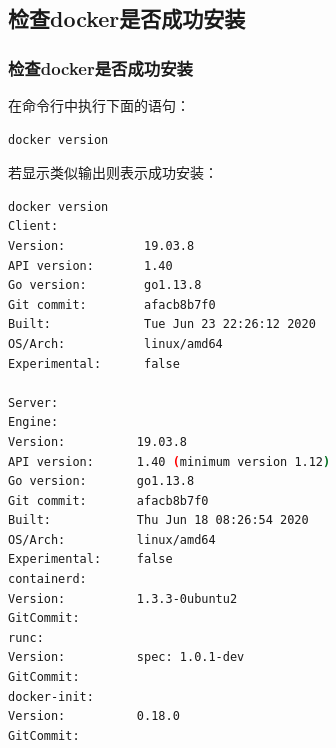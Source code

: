 \documentclass[11pt]{beamer}
\begin{document}
\subsection{检查docker是否成功安装}
\begin{frame}[fragile]
	\frametitle{检查docker是否成功安装}
	在命令行中执行下面的语句：
	\begin{lstlisting}[language=sh,numbers=none]
docker version
\end{lstlisting}
	
	若显示类似输出则表示成功安装：
\begin{lstlisting}[language=sh,linerange={1-18},basicstyle=\fontsize{6}{8}\ttfamily]
docker version
Client:
Version:           19.03.8
API version:       1.40
Go version:        go1.13.8
Git commit:        afacb8b7f0
Built:             Tue Jun 23 22:26:12 2020
OS/Arch:           linux/amd64
Experimental:      false

Server:
Engine:
Version:          19.03.8
API version:      1.40 (minimum version 1.12)
Go version:       go1.13.8
Git commit:       afacb8b7f0
Built:            Thu Jun 18 08:26:54 2020
OS/Arch:          linux/amd64
Experimental:     false
containerd:
Version:          1.3.3-0ubuntu2
GitCommit:        
runc:
Version:          spec: 1.0.1-dev
GitCommit:        
docker-init:
Version:          0.18.0
GitCommit:        
\end{lstlisting}
\end{frame}
\end{document}
